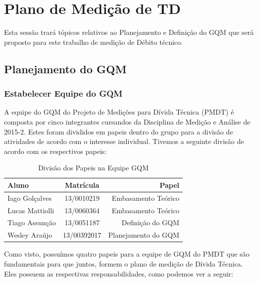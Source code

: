 \chapter[Plano de Medição de TD ]{Plano de Medição de TD }

Esta sessão trará tópicos relativos ao Planejamento e Definição do GQM que será
proposto para este trabalho de medição de Débito técnico.

\section{Planejamento do GQM}
\subsection{Estabelecer Equipe do GQM}
A equipe do GQM do Projeto de Medições para Dívida Técnica (PMDT) é composta por
cinco integrantes cursandos da Disciplina de Medição e Análise de 2015-2. Estes
foram divididos em papeis dentro do grupo para a divisão de atividades de acordo
com o interesse individual. Tivemos a seguinte divisão de acordo com os respectivos
papeis:
\\


\begin{table}[ht]
\caption{Divisão dos Papeis na Equipe GQM}
\centering
\begin{tabular}{|l*{1}{c}r|}
\hline
Aluno              & Matrícula & Papel \\
\hline
Iago Golçalves & 13/0010219 &   Embasamento Teórico   \\
\hline
Lucas Mattiolli & 13/0060364 &   Embasamento Teórico \\
\hline
Tiago Assunção & 13/0051187 &   Definição do GQM  \\
\hline
Wesley Araújo & 13/00392017 &   Planejamento do GQM \\
\hline
\end{tabular}
\label{table:papeisgqm}
\end{table}

Como visto, possuímos quatro papeis para a equipe de GQM do PMDT que são fundamentais
para que juntos, formem o plano de medição de Dívida Técnica. Eles possuem as respectivas
responsabilidades, como podemos ver a seguir:

